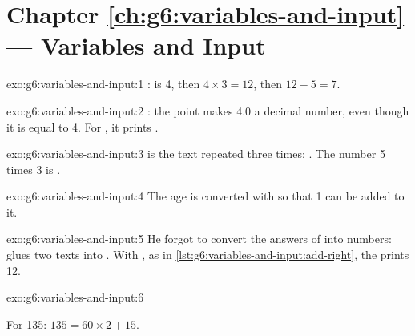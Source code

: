 \section*{Chapter \ref{ch:g6:variables-and-input} --- Variables and Input}

\begin{solution}{exo:g6:variables-and-input:1}
:  is 4, then $4 \times 3 = 12$, then $12 - 5 = 7$.
\end{solution}

\begin{solution}{exo:g6:variables-and-input:2}
: the point makes 4.0 a decimal number, even though it
is equal to 4. For , it prints .
\end{solution}

\begin{solution}{exo:g6:variables-and-input:3}
 is the text  repeated three times: . The
number 5 times 3 is .
\end{solution}

\begin{solution}{exo:g6:variables-and-input:4}
The age is converted with  so that 1 can be added to it.

\label{lst:g6:variables-and-input:sol-name-age}
\end{solution}

\begin{solution}{exo:g6:variables-and-input:5}
He forgot to convert the answers of  into numbers: 
glues two texts into . With , as in
\cref{lst:g6:variables-and-input:add-right}, the  prints 12.
\end{solution}

\begin{solution}{exo:g6:variables-and-input:6}
\label{lst:g6:variables-and-input:sol-minutes}

For 135: $135 = 60 \times 2 + 15$.
\end{solution}

